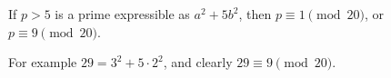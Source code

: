 \section{}

If $p > 5$ is a prime expressible as $a^2 + 5 b^2$, then $p \equiv 1 \pmod{20}$,
or $p \equiv 9 \pmod{20}$.

For example $29 = 3^2 + 5 \cdot 2^2$, and clearly $29 \equiv 9 \pmod{20}$. 
